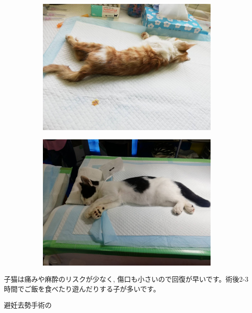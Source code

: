 \documentclass{jsarticle}
\begin{document}
	\begin{figure}[htbp]
		\centering
		\begin{subfigure}{0.4\columnwidth}
			\centering
			\includegraphics[width=\columnwidth]{3.jpg}
		\end{subfigure}
		\begin{subfigure}{0.4\columnwidth}
			\centering
			\includegraphics[width=\columnwidth]{4.jpg}
		\end{subfigure}
	\end{figure}

\Large
  子猫は痛みや麻酔のリスクが少なく, 傷口も小さいので回復が早いです。術後2-3時間でご飯を食べたり遊んだりする子が多いです。

	避妊去勢手術の
\end{document}
